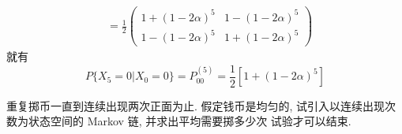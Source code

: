 \documentclass[boxes]{homework}
\begin{document}
\begin{solution}
\begin{equation}
\begin{aligned}
             & = \frac{1}{2} \begin{pmatrix}
                                 1 + (1 - 2\alpha)^5 & 1 - (1 - 2\alpha)^5 \\
                                 1 - (1 - 2\alpha)^5 & 1 + (1 - 2\alpha)^5
                             \end{pmatrix}
        \end{aligned}
    \end{equation}
    就有
    \begin{equation}
        P\{X_5 = 0\vert X_0 = 0\} = P^{(5)}_{00} = \frac{1}{2} \left[1 + (1 - 2\alpha)^5\right]
    \end{equation}
\end{solution}
\newpage
{}
\begin{problem}
重复掷币一直到连续出现两次正面为止. 假定钱币是均匀的, 试引入以连续出现次数为状态空间的 Markov 链, 并求出平均需要掷多少次
试验才可以结束.
\end{problem}
\end{document}
